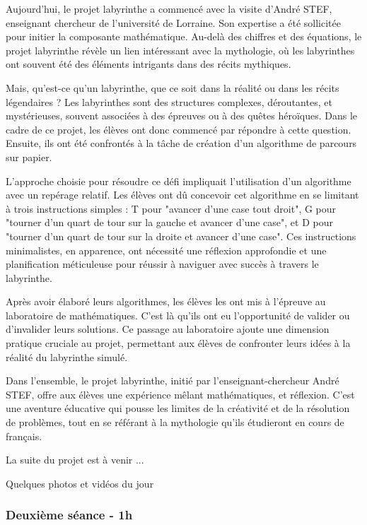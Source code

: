 Aujourd'hui, le projet labyrinthe a commencé avec la visite d'André STEF, enseignant chercheur de l'université de Lorraine. Son expertise a été sollicitée pour initier la composante mathématique. Au-delà des chiffres et des équations, le projet labyrinthe révèle un lien intéressant avec la mythologie, où les labyrinthes ont souvent été des éléments intrigants dans des récits mythiques.

Mais, qu'est-ce qu'un labyrinthe, que ce soit dans la réalité ou dans les récits légendaires ? Les labyrinthes sont des structures complexes, déroutantes, et mystérieuses, souvent associées à des épreuves ou à des quêtes héroïques. Dans le cadre de ce projet, les élèves ont donc commencé par répondre à cette question. Ensuite, ils ont été confrontés à la tâche de création d'un algorithme de parcours sur papier.

L'approche choisie pour résoudre ce défi impliquait l'utilisation d'un algorithme avec un repérage relatif. Les élèves ont dû concevoir cet algorithme en se limitant à trois instructions simples : T pour "avancer d'une case tout droit", G pour "tourner d'un quart de tour sur la gauche et avancer d'une case", et D pour "tourner d'un quart de tour sur la droite et avancer d'une case". Ces instructions minimalistes, en apparence, ont nécessité une réflexion approfondie et une planification méticuleuse pour réussir à naviguer avec succès à travers le labyrinthe.

Après avoir élaboré leurs algorithmes, les élèves les ont mis à l'épreuve au laboratoire de mathématiques. C'est là qu'ils ont eu l'opportunité de valider ou d'invalider leurs solutions. Ce passage au laboratoire ajoute une dimension pratique cruciale au projet, permettant aux élèves de confronter leurs idées à la réalité du labyrinthe simulé.

Dans l'ensemble, le projet labyrinthe, initié par l'enseignant-chercheur André STEF, offre aux élèves une expérience mêlant mathématiques, et réflexion. C'est une aventure éducative qui pousse les limites de la créativité et de la résolution de problèmes, tout en se référant à la mythologie qu'ils étudieront en cours de français.
  
La suite du projet est à venir ...

Quelques photos et vidéos du jour
\subsubsection*{Deuxième séance - 1h}

